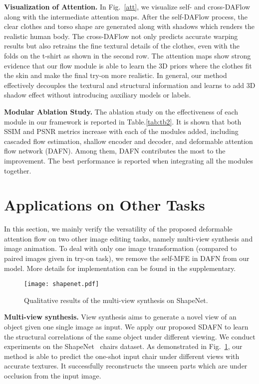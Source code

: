 \documentclass[runningheads]{llncs}
\begin{document}
\textbf{Visualization of Attention.} In Fig.~\ref{att}, we visualize self- and cross-DAFlow along with the intermediate attention maps. After the self-DAFlow process, the clear clothes and torso shape are generated along with shadows which renders the realistic human body. The cross-DAFlow not only predicts accurate warping results but also retrains the fine textural details of the clothes, even with the folds on the t-shirt as shown in the second row. The attention maps show strong evidence that our flow module is able to learn the 3D priors where the clothes fit the skin and make the final try-on more realistic. In general, our method effectively decouples the textural and structural information and learns to add 3D shadow effect without introducing auxiliary models or labels.


\textbf{Modular Ablation Study.} 
The ablation study on the effectiveness of each module in our framework is reported in Table.\ref{tab:tb2}. It is shown that both SSIM and PSNR metrics increase with each of the modules added, including cascaded flow estimation, shallow encoder and decoder, and deformable attention flow network (DAFN). Among them, DAFN contributes the most to the improvement. The best performance is reported when integrating all the modules together.


\section{Applications on Other Tasks}
In this section, we mainly verify the versatility of the proposed deformable attention flow on two other image editing tasks, namely multi-view synthesis and image animation. To deal with only one image transformation (compared to paired images given in try-on task), we remove the self-MFE in DAFN  from our model. More details for implementation can be found in the supplementary.

\begin{figure}[t]
\centering
\texttt{[image: shapenet.pdf]}

   \caption{Qualitative results of the multi-view synthesis on ShapeNet.\label{shape}}

\end{figure}

\textbf{Multi-view synthesis.}
View synthesis aims to generate a novel view of an object given one single image as input. We apply our proposed SDAFN to learn the structural correlations of the same object under different viewing. We conduct experiments on the ShapeNet~\cite{chang2015shapenet} chairs dataset. As demonstrated in Fig.~\ref{shape}, our method is able to predict the one-shot input chair under different views with accurate textures. It successfully reconstructs the unseen parts which are under occlusion from the input image.
\end{document}
